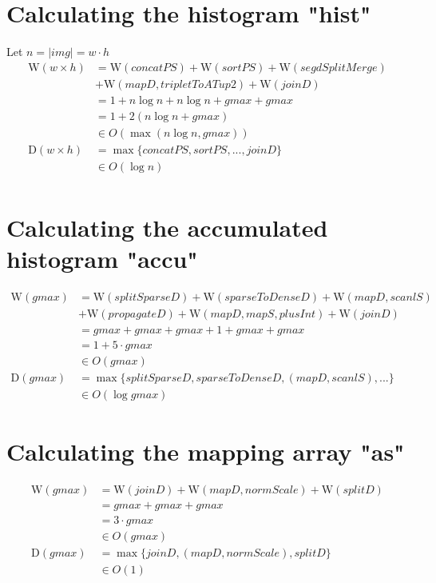 \documentclass{article}
\newcommand{\W}[0]{\textrm{W}}
\newcommand{\D}[0]{\textrm{D}}
\begin{document}
    \section{Calculating the histogram "hist"}
      Let $n = |img| = w\cdot h$
      \begin{equation}
      \begin{split}
      \W(w \times h)
            & = \W(concatPS) + \W(sortPS) + \W(segdSplitMerge) \\
            & + \W(mapD,tripletToATup2) + \W(joinD) \\
            & = 1 + n \log n + n \log n + gmax + gmax \\
            & = 1 + 2 (n \log n + gmax) \\
            & \in O(\max(n \log n, gmax)) \\
      \D(w \times h)
            & = \max \{ concatPS,sortPS,...,joinD\} \\
            & \in O(\log n) \\
      \end{split}
      \end{equation}
    
    \section{Calculating the accumulated histogram "accu"}
      \begin{equation}
      \begin{split}
      \W(gmax)
            & = \W(splitSparseD) + \W(sparseToDenseD) + \W(mapD,scanlS) \\
            &     + \W(propagateD) + \W(mapD,mapS,plusInt) + \W(joinD) \\
            & = gmax + gmax + gmax + 1 + gmax + gmax\\
            & = 1 + 5 \cdot gmax \\
            & \in O(gmax) \\
      \D(gmax)
          & = \max \{ splitSparseD, sparseToDenseD, (mapD,scanlS),...\} \\
          & \in O(\log gmax)
      \end{split}
      \end{equation}
    
    \section{Calculating the mapping array "as"}
      \begin{equation}
      \begin{split}
      \W(gmax)
            & = \W(joinD) + \W(mapD,normScale) + \W(splitD) \\
            & = gmax + gmax + gmax \\
            & = 3 \cdot gmax \\
            & \in O(gmax) \\
      \D(gmax)
          & = \max \{ joinD,(mapD,normScale),splitD\} \\
          & \in O(1)
      \end{split}
      \end{equation}
      
\end{document}
